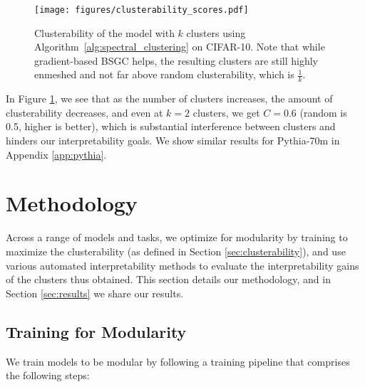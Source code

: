 \begin{figure}[h]
\vspace{-0.2cm}
\centering
\texttt{[image: figures/clusterability\_scores.pdf]}
\vspace{-0.1cm}
    \caption{Clusterability of the model with $k$ clusters using Algorithm~\ref{alg:spectral_clustering} on CIFAR-10. Note that while gradient-based BSGC helps, the resulting clusters are still highly enmeshed and not far above random clusterability, which is $\frac{1}{k}$.}
    \label{fig:clusterability}
\end{figure}

In Figure \ref{fig:clusterability}, we see that as the number of clusters increases, the amount of clusterability decreases, and even at $k=2$ clusters, we get $C=0.6$ (random is 0.5, higher is better), which is substantial interference between clusters and hinders our interpretability goals. We show similar results for Pythia-70m \cite{biderman2023pythiasuiteanalyzinglarge} in Appendix \ref{app:pythia}.

\section{Methodology}
\label{sec:methodology}

Across a range of models and tasks, we optimize for modularity by training to maximize the clusterability (as defined in Section \ref{sec:clusterability}), and use various automated interpretability methods to evaluate the interpretability gains of the clusters thus obtained. This section details our methodology, and in Section \ref{sec:results} we share our results.

\subsection{Training for Modularity}
\label{subsec:training}

We train models to be modular by following a training pipeline that comprises the following steps:

